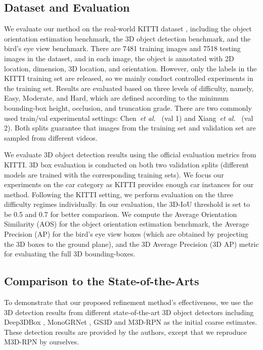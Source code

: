 \documentclass[runningheads]{llncs}
\begin{document}
\subsection{Dataset and Evaluation}
We evaluate our method on the real-world KITTI dataset \cite{geiger2012we}, including the object orientation estimation benchmark, the 3D object detection benchmark, and the bird's eye view benchmark. There are 7481 training images and 7518 testing images in the dataset, and in each image, the object is annotated with 2D location, dimension, 3D location, and orientation. However, only the labels in the KITTI training set are released, so we mainly conduct controlled experiments in the training set. Results are evaluated based on three levels of difficulty, namely, Easy, Moderate, and Hard, which are defined according to the minimum bounding-box height, occlusion, and truncation grade. There are two commonly used train/val experimental settings: Chen~\emph{et al.}~\cite{chen20153d,chen2016monocular} (val 1) and Xiang~\emph{et al.}~\cite{xiang2015data,xiang2017subcategory} (val 2). Both splits guarantee that images from the training set and validation set are sampled from different videos. 

We evaluate 3D object detection results using the official evaluation metrics from KITTI. 3D box evaluation is conducted on both two validation splits (different models are trained with the corresponding training sets). We focus our experiments on the car category as KITTI provides enough car instances for our method. Following the KITTI setting, we perform evaluation on the three difficulty regimes individually. In our evaluation, the 3D-IoU threshold is set to be 0.5 and 0.7 for better comparison. We compute the Average Orientation Similarity (AOS) for the object orientation estimation benchmark, the Average Precision (AP) for the bird's eye view boxes (which are obtained by projecting the 3D boxes to the ground plane), and the 3D Average Precision (3D AP) metric for evaluating the full 3D bounding-boxes.

\subsection{Comparison to the State-of-the-Arts}

To demonstrate that our proposed refinement method's effectiveness, we use the 3D detection results from different state-of-the-art 3D object detectors including Deep3DBox \cite{mousavian20173d}, MonoGRNet \cite{qin2019monogrnet}, GS3D \cite{li2019gs3d} and M3D-RPN \cite{brazil2019m3d} as the initial coarse estimates. These detection results are provided by the authors, except that we reproduce M3D-RPN by ourselves.
\end{document}
